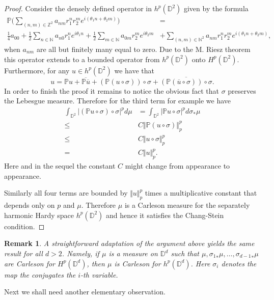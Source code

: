 \documentclass{amsart}
\numberwithin{equation}{section}
\newtheorem{rem}[thm]{Remark}
\newcommand{\D}{\mathbb{D}}
\begin{document}
\begin{proof}
Consider the  densely defined operator in $h^p(\mathbb{D}^2)$ given by the formula 
\begin{align*} \mathbb{P}\Big( \sum_{(n,m) \in \mathbb{Z}^2} a_{nm} r_1^nr_2^m e^{i(\theta_1n+ \theta_2 m)} \Big) & = \\ \frac14 a_{00} +  
\frac12 \sum_{n\in \mathbb{N}} a_{n0} r_1^n e^{i\theta_1 n} + \frac 12 \sum_{m\in \mathbb{N}} a_{0m}r_2^m e^{i\theta_2 m} & + \sum_{(n,m) \in \mathbb{N}^2} a_{nm} r_1^nr_2^m e^{i(\theta_1n+ \theta_2 m)}, \end{align*}
when $a_{nm}$ are all but finitely many equal to zero. 
	Due to the M. Riesz theorem this operator extends to a bounded operator from $h^p(\mathbb{D}^2)$ 
	onto $H^p(\mathbb{D}^2)$.
	Furthermore, for any $u \in h^p(\mathbb{D}^2)$ we have that 
	\[ u = \mathbb{P}u + \overline{\mathbb{P}\overline{u} } + (\mathbb{P}(u\circ \sigma) )\circ \sigma + \overline{  (\mathbb{P}(\overline{u}\circ \sigma)) \circ \sigma}.    \]
        In order to finish the  proof it remains to notice the obvious fact that $\sigma$ preserves the Lebesgue measure. Therefore for the third term for example we have 
	\begin{align*}
		\int_{\mathbb{D}^2}|(\mathbb{P}u\circ \sigma )\circ \sigma|^p d\mu & = \int_{\mathbb{D}^2} | \mathbb{P}u\circ \sigma |^p d\sigma_* \mu \\
		\leq & C \Vert \mathbb{P}( u \circ \sigma) \Vert^p_p \\
		\leq & C \Vert u \circ \sigma \Vert^p_p \\
		= & C \Vert u \Vert^p_p.
	\end{align*}
Here and in the sequel the constant $C$ might change from appearance to appearance. 

	Similarly all four terms are bounded by $\Vert u\Vert_p^p$ times a multiplicative   constant that depends only on $p$ and $\mu$. 
	Therefore $\mu $ is a Carleson measure for the separately harmonic Hardy space $h^p(\mathbb{D}^2)$ and hence it satisfies the Chang-Stein condition. 
\end{proof}
\begin{rem}
    A straightforward adaptation of the argument above yields the same result for all $d>2$. Namely, if $\mu$ is a measure on $\D^d$ such that $\mu, {\sigma_1}_*\mu,\dots, {\sigma_{d-1}}_*\mu$ are Carleson for $H^p(\D^d)$, then $\mu$ is Carleson for $h^p(\D^d)$. Here $\sigma_i$ denotes the map the conjugates the $i$-th variable. 
\end{rem}
Next we shall need another elementary observation. 
\end{document}
